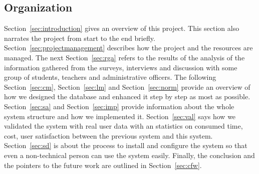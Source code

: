 \subsection{Organization}
Section~\ref{sec:introduction} gives an overview of this project. This section also narrates the project from start to the end briefly. Section~\ref{sec:projectmanagement} describes how the project and the resources are managed. The next Section~\ref{sec:rga} refers to the results of the analysis of the information gathered from the surveys, interviews and discussion with some group of students, teachers and administrative officers. The following Section~\ref{sec:cm}, Section~\ref{sec:lm} and Section~\ref{sec:norm} provide an overview of how we designed the database and enhanced it step by step as most as possible. Section~\ref{sec:sa} and Section~\ref{sec:imp} provide information about the whole system structure and how we implemented it. Section~\ref{sec:val} says how we validated the system with real user data with an statistics on consumed time, cost, user satisfaction between the previous system and this system. Section~\ref{sec:sd} is about the process to install and configure the system so that even a non-technical person can use the system easily. Finally, the conclusion and the pointers to the future work are outlined in Section~\ref{sec:cfw}.

\clearpage